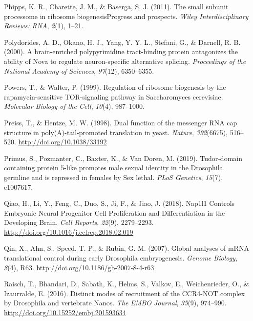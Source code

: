 \documentclass[12pt,twoside]{reedthesis}
\newlength{\cslhangindent}
\newenvironment{cslreferences}%
  {\setlength{\parindent}{0pt}%
  \everypar{\setlength{\hangindent}{\cslhangindent}}\ignorespaces}%
  {\par}
\begin{document}
\begin{cslreferences}
\leavevmode\hypertarget{ref-Phipps2011a}{}%
Phipps, K. R., Charette, J. M., \& Baserga, S. J. (2011). The small subunit processome in ribosome biogenesisProgress and prospects. \emph{Wiley Interdisciplinary Reviews: RNA}, \emph{2}(1), 1--21.

\leavevmode\hypertarget{ref-Polydorides2000}{}%
Polydorides, A. D., Okano, H. J., Yang, Y. Y. L., Stefani, G., \& Darnell, R. B. (2000). A brain-enriched polypyrimidine tract-binding protein antagonizes the ability of Nova to regulate neuron-specific alternative splicing. \emph{Proceedings of the National Academy of Sciences}, \emph{97}(12), 6350--6355.

\leavevmode\hypertarget{ref-powersRegulationRibosomeBiogenesis1999}{}%
Powers, T., \& Walter, P. (1999). Regulation of ribosome biogenesis by the rapamycin-sensitive TOR-signaling pathway in Saccharomyces cerevisiae. \emph{Molecular Biology of the Cell}, \emph{10}(4), 987--1000.

\leavevmode\hypertarget{ref-Preiss1998g}{}%
Preiss, T., \& Hentze, M. W. (1998). Dual function of the messenger RNA cap structure in poly(A)-tail-promoted translation in yeast. \emph{Nature}, \emph{392}(6675), 516--520. \url{http://doi.org/10.1038/33192}

\leavevmode\hypertarget{ref-Primus2019}{}%
Primus, S., Pozmanter, C., Baxter, K., \& Van Doren, M. (2019). Tudor-domain containing protein 5-like promotes male sexual identity in the Drosophila germline and is repressed in females by Sex lethal. \emph{PLoS Genetics}, \emph{15}(7), e1007617.

\leavevmode\hypertarget{ref-qiaoNap1l1ControlsEmbryonic2018}{}%
Qiao, H., Li, Y., Feng, C., Duo, S., Ji, F., \& Jiao, J. (2018). Nap1l1 Controls Embryonic Neural Progenitor Cell Proliferation and Differentiation in the Developing Brain. \emph{Cell Reports}, \emph{22}(9), 2279--2293. \url{http://doi.org/10.1016/j.celrep.2018.02.019}

\leavevmode\hypertarget{ref-qinGlobalAnalysesMRNA2007a}{}%
Qin, X., Ahn, S., Speed, T. P., \& Rubin, G. M. (2007). Global analyses of mRNA translational control during early Drosophila embryogenesis. \emph{Genome Biology}, \emph{8}(4), R63. \url{http://doi.org/10.1186/gb-2007-8-4-r63}

\leavevmode\hypertarget{ref-Raisch2016h}{}%
Raisch, T., Bhandari, D., Sabath, K., Helms, S., Valkov, E., Weichenrieder, O., \& Izaurralde, E. (2016). Distinct modes of recruitment of the CCR4-NOT complex by Drosophila and vertebrate Nanos. \emph{The EMBO Journal}, \emph{35}(9), 974--990. \url{http://doi.org/10.15252/embj.201593634}


\end{cslreferences}
\end{document}
